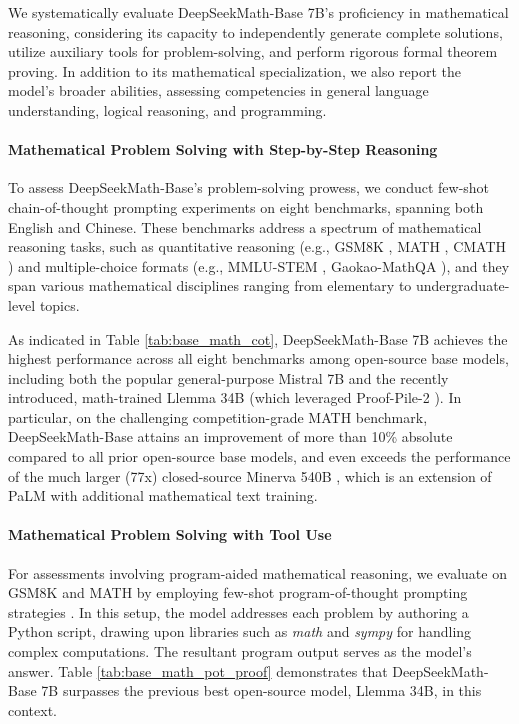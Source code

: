 We systematically evaluate DeepSeekMath-Base 7B's proficiency in mathematical reasoning, considering its capacity to independently generate complete solutions, utilize auxiliary tools for problem-solving, and perform rigorous formal theorem proving. In addition to its mathematical specialization, we also report the model's broader abilities, assessing competencies in general language understanding, logical reasoning, and programming.

\paragraph{Mathematical Problem Solving with Step-by-Step Reasoning}

To assess DeepSeekMath-Base's problem-solving prowess, we conduct few-shot chain-of-thought prompting \citep{cot} experiments on eight benchmarks, spanning both English and Chinese. These benchmarks address a spectrum of mathematical reasoning tasks, such as quantitative reasoning (e.g., GSM8K \citep{gsm8k}, MATH \citep{MATH}, CMATH \citep{wei2023cmath}) and multiple-choice formats (e.g., MMLU-STEM \citep{mmlu}, Gaokao-MathQA \citep{agieval}), and they span various mathematical disciplines ranging from elementary to undergraduate-level topics.

As indicated in Table \ref{tab:base_math_cot}, DeepSeekMath-Base 7B achieves the highest performance across all eight benchmarks among open-source base models, including both the popular general-purpose Mistral 7B \citep{mistral} and the recently introduced, math-trained Llemma 34B \citep{llemma} (which leveraged Proof-Pile-2 \citep{llemma}). In particular, on the challenging competition-grade MATH benchmark, DeepSeekMath-Base attains an improvement of more than 10\% absolute compared to all prior open-source base models, and even exceeds the performance of the much larger (77x) closed-source Minerva 540B \citep{minerva}, which is an extension of PaLM \citep{palm} with additional mathematical text training.

\paragraph{Mathematical Problem Solving with Tool Use} For assessments involving program-aided mathematical reasoning, we evaluate on GSM8K and MATH by employing few-shot program-of-thought prompting strategies \citep{pot,pal}. In this setup, the model addresses each problem by authoring a Python script, drawing upon libraries such as \textit{math} and \textit{sympy} for handling complex computations. The resultant program output serves as the model’s answer. Table \ref{tab:base_math_pot_proof} demonstrates that DeepSeekMath-Base 7B surpasses the previous best open-source model, Llemma 34B, in this context.

